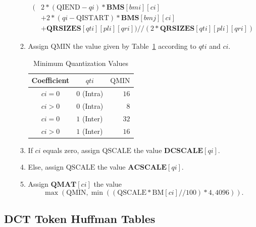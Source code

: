 \documentclass[9pt,letterpaper]{book}
\newcommand{\idx}[1]{{\ensuremath{\mathit{#1}}}}
\newcommand{\qti}{\idx{qti}}
\newcommand{\pli}{\idx{pli}}
\newcommand{\qi}{\idx{qi}}
\newcommand{\ci}{\idx{ci}}
\newcommand{\bmi}{\idx{bmi}}
\newcommand{\bmj}{\idx{bmj}}
\newcommand{\qri}{\idx{qri}}
\newcommand{\bitvar}[1]{\ensuremath{\mathbf{\bm{#1}}}}
\newcommand{\locvar}[1]{\ensuremath{\mathrm{#1}}}
\numberwithin{equation}{chapter}
\numberwithin{figure}{chapter}
\numberwithin{table}{chapter}
\begin{document}
\begin{enumerate}
\begin{enumerate}
\begin{displaymath}
\begin{split}
(&2*(\locvar{QIEND}-\bitvar{\qi})*\bitvar{BMS}[\locvar{\bmi}][\locvar{\ci}]\\
 &+2*(\bitvar{\qi}-
   \locvar{QISTART})*\bitvar{BMS}[\locvar{\bmj}][\locvar{\ci}]\\
 &+\bitvar{QRSIZES}[\bitvar{\qti}][\bitvar{\pli}][\locvar{\qri}])//
 (2*\bitvar{QRSIZES}[\bitvar{\qti}][\bitvar{\pli}][\locvar{\qri}])
\end{split}
\end{displaymath}
\item
Assign \locvar{QMIN} the value given by Table~\ref{tab:qmin} according to
 \bitvar{\qti} and \locvar{\ci}.

\begin{table}[htbp]
\begin{center}
\begin{tabular}{clr}\toprule
Coefficient      & \multicolumn{1}{c}{\bitvar{\qti}}
                               & \locvar{QMIN} \\\midrule
$\locvar{\ci}=0$ & $0$ (Intra) & $16$          \\
$\locvar{\ci}>0$ & $0$ (Intra) & $8$           \\
$\locvar{\ci}=0$ & $1$ (Inter) & $32$          \\
$\locvar{\ci}>0$ & $1$ (Inter) & $16$          \\
\bottomrule\end{tabular}
\end{center}
\caption{Minimum Quantization Values}
\label{tab:qmin}
\end{table}

\item
If \locvar{\ci} equals zero, assign $\locvar{QSCALE}$ the value
 $\bitvar{DCSCALE}[\bitvar{\qi}]$.
\item
Else, assign $\locvar{QSCALE}$ the value
 $\bitvar{ACSCALE}[\bitvar{\qi}]$.
\item
Assign $\bitvar{QMAT}[\locvar{\ci}]$ the value
\begin{displaymath}
\max(\locvar{QMIN},
 \min((\locvar{QSCALE}*\locvar{BM}[\locvar{\ci}]//100)*4,4096)).
\end{displaymath}
\end{enumerate}
\end{enumerate}

\subsection{DCT Token Huffman Tables}
\label{sub:huffman-tables}
\end{document}
